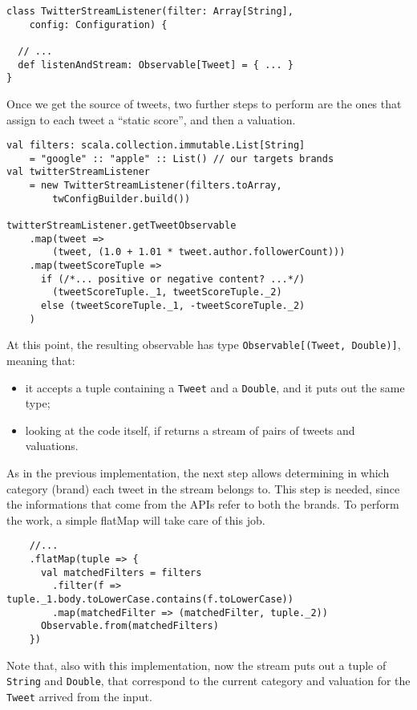 \begin{verbatim}
class TwitterStreamListener(filter: Array[String],
    config: Configuration) {

  // ...
  def listenAndStream: Observable[Tweet] = { ... }
}
\end{verbatim}

Once we get the source of tweets, two further steps to perform are the
ones that assign to each tweet a ``static score'', and then a
valuation.

\begin{verbatim}
val filters: scala.collection.immutable.List[String]
    = "google" :: "apple" :: List() // our targets brands
val twitterStreamListener
    = new TwitterStreamListener(filters.toArray,
        twConfigBuilder.build())

twitterStreamListener.getTweetObservable
    .map(tweet =>
        (tweet, (1.0 + 1.01 * tweet.author.followerCount)))
    .map(tweetScoreTuple =>
      if (/*... positive or negative content? ...*/)
        (tweetScoreTuple._1, tweetScoreTuple._2)
      else (tweetScoreTuple._1, -tweetScoreTuple._2)
    )
\end{verbatim}

At this point, the resulting observable has type
\texttt{Observable{[}(Tweet,\ Double){]}}, meaning that:

\begin{itemize}
\itemsep1pt\parskip0pt
\item
  it accepts a tuple containing a \texttt{Tweet} and a \texttt{Double},
  and it puts out the same type;
\item
  looking at the code itself, if returns a stream of pairs of tweets and
  valuations.
\end{itemize}

As in the previous implementation, the next step allows determining in
which category (brand) each tweet in the stream belongs to. This step is
needed, since the informations that come from the APIs refer to both the
brands. To perform the work, a simple flatMap will take care of this
job.

\begin{verbatim}
    //...
    .flatMap(tuple => {
      val matchedFilters = filters
        .filter(f => tuple._1.body.toLowerCase.contains(f.toLowerCase))
        .map(matchedFilter => (matchedFilter, tuple._2))
      Observable.from(matchedFilters)
    })
\end{verbatim}

Note that, also with this implementation, now the stream puts out a
tuple of \texttt{String} and \texttt{Double}, that correspond to the
current category and valuation for the \texttt{Tweet} arrived from the
input.

